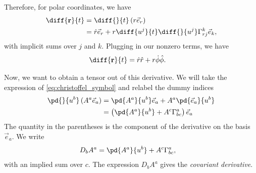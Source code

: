 \documentclass[10pt]{mypackage}
\begin{document}
\begin{example}
    Therefore, for polar coordinates, we have
    \begin{align*}
      \diff{\mathbf{r}}{t} &= \diff{}{t}\left( r\vec{e}_r \right)\\
                           &= \dot{r}\vec{e}_r + r\diff{u^{j}}{t}\diff{}{u^{j}}\Gamma_{r j}^{k}\vec{e}_k,
    \end{align*}
    with implicit sums over $j$ and $k$. Plugging in our nonzero terms, we have
    \begin{align*}
      \diff{\mathbf{r}}{t} &= \dot{r}\hat{r} + r\dot{\phi}\hat{\phi}.
    \end{align*}
  \end{example}
  Now, we want to obtain a tensor out of this derivative. We will take the expression of \eqref{eq:christoffel_symbol} and relabel the dummy indices
  \begin{align*}
    \pd{}{u^{b}}\left( A^{a}\vec{e}_a \right) &= \pd{A^{a}}{u^{b}}\vec{e}_a + A^{a}\pd{\vec{e}_a}{u^{b}}\\
                                              &= \left( \pd{A^{a}}{u^{b}}+ A^{c}\Gamma^{a}_{bc} \right)\vec{e}_a
  \end{align*}
  The quantity in the parentheses is the component of the derivative on the basis $\vec{e}_a$. We write
  \begin{align*}
    D_{b} A^{a} &= \pd{A^{a}}{u^{b}} + A^{c}\Gamma_{bc}^{a},
  \end{align*}
  with an implied sum over $c$. The expression $D_b A^{a}$ gives the \textit{covariant derivative}.\newline
\end{document}
